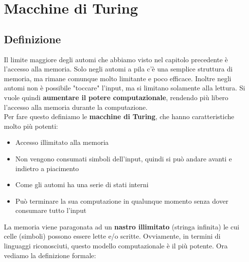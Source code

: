\chapter{Macchine di Turing}
\section{Definizione}
Il limite maggiore degli automi che abbiamo visto nel capitolo precedente è l'accesso alla memoria.
Solo negli automi a pila c'è una semplice struttura di memoria, ma rimane comunque molto limitante e poco efficace.
Inoltre negli automi non è possibile "toccare" l'input, ma si limitano solamente alla lettura.
Si vuole quindi \textbf{aumentare il potere computazionale}, rendendo più libero l'accesso alla memoria durante la computazione.\\
Per fare questo definiamo le \textbf{macchine di Turing}, che hanno caratteristiche molto più potenti:
\begin{itemize}
    \item Accesso illimitato alla memoria
    \item Non vengono consumati simboli dell'input, quindi si può andare avanti e indietro a piacimento
    \item Come gli automi ha una serie di stati interni
    \item Può terminare la sua computazione in qualunque momento senza dover consumare tutto l'input
\end{itemize} 
La memoria viene paragonata ad un \textbf{nastro illimitato} (stringa infinita) le cui celle (simboli) possono essere lette e/o scritte.
Ovviamente, in termini di linguaggi riconosciuti, questo modello computazionale è il più potente. Ora vediamo la definizione formale:\smallskip\\
